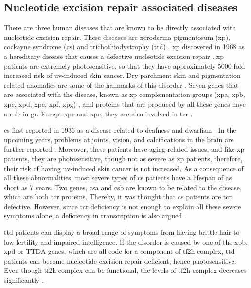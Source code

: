 \subsection{Nucleotide excision repair associated diseases}

There are three human diseases that are known to be directly associated with nucleotide excision repair. These diseases are xeroderma pigmentosum (\gls{xp}), cockayne syndrome (\gls{cs}) and trichothiodystrophy (\gls{ttd}) \citep{de2000nucleotide,lehmann2003dna}. 
\gls{xp} discovered in 1968 as a hereditary disease that causes a defective nucleotide excision repair \citep{cleaver1968defective}. \gls{xp} patients are extremely photosensitive, so that they have approximately 5000-fold increased risk of \gls{uv}-induced skin cancer. Dry parchment skin and pigmentation related anomalies are some of the hallmarks of this disorder \citep{de2000nucleotide}.  Seven genes that are associated with the disease, known as \gls{xp} complementation groups (\gls{xpa}, \gls{xpb}, \gls{xpc}, \gls{xpd}, \gls{xpe}, \gls{xpf}, \gls{xpg}) \citep{cleaver1975xeroderma}, and proteins that are produced by all these genes have a role in \gls{gr}. Except \gls{xpc} and \gls{xpe}, they are also involved in \gls{tcr} \citep{van1995transcription}.  

\gls{cs} first reported in 1936 as a disease related to deafness and dwarfism \citep{cockayne1936dwarfism}. In the upcoming years, problems at joints, vision, and calcifications in the brain are further reported \citep{cockayne1946dwarfism,neill1950syndrome}. Moreover, these patients have aging related issues, and like \gls{xp} patients, they are photosensitive, though not as severe as \gls{xp} patients, therefore, their risk of having \gls{uv}-induced skin cancer is not increased. As a consequence of all these abnormalities, most severe types of \gls{cs} patients have a lifespan of as short as 7 years. Two genes, \gls{csa} and \gls{csb} are known to be related to the disease, which are both \gls{tcr} proteins. Thereby, it was thought that \gls{cs} patients are \gls{tcr} defective. However, since \gls{tcr} deficiency is not enough to explain all these severe symptoms alone, a deficiency in transcription is also argued \citep{drapkin1994dual}.

\gls{ttd} patients can display a broad range of symptoms from having brittle hair to low fertility and impaired intelligence. If the disorder is caused by one of the \gls{xpb}, \gls{xpd} or TTDA genes, which are all code for a component of \gls{tf2h} complex, \gls{ttd} patients can become nucleotide excision repair deficient, hence photosensitive. Even though \gls{tf2h} complex can be functional, the levels of \gls{tf2h} complex decreases significantly \citep{giglia2006dynamic}.

